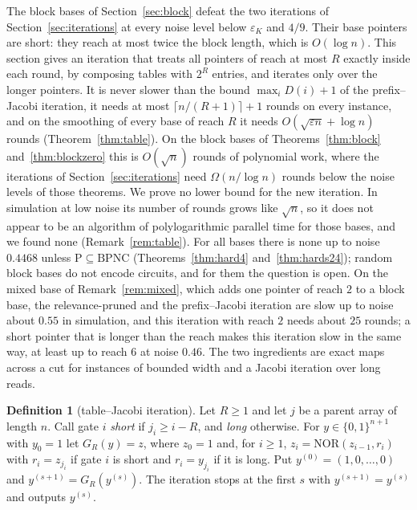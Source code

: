 \documentclass[11pt]{amsart}
\theoremstyle{definition}
\newtheorem{definition}[theorem]{Definition}
\theoremstyle{remark}
\newcommand{\eps}{\varepsilon}
\newcommand{\NOR}{\mathrm{NOR}}
\begin{document}
The block bases of Section~\ref{sec:block} defeat the two iterations of Section~\ref{sec:iterations} at every noise
level below $\eps_K$ and $4/9$. Their base pointers are short: they reach at most twice the block
length, which is $O(\log n)$. This section gives an iteration that treats all pointers of reach at
most $R$ exactly inside each round, by composing tables with $2^R$ entries, and iterates only
over the longer pointers. It is never slower than the bound $\max_iD(i)+1$ of the prefix--Jacobi
iteration, it needs at most $\lceil n/(R+1)\rceil+1$ rounds on every instance, and on the
smoothing of every base of reach $R$ it needs $O(\sqrt{\eps n}+\log n)$ rounds
(Theorem~\ref{thm:table}). On the block bases of Theorems~\ref{thm:block}
and~\ref{thm:blockzero} this is $O(\sqrt n)$ rounds of polynomial work, where the iterations of
Section~\ref{sec:iterations} need $\Omega(n/\log n)$ rounds below the noise levels of those theorems. We prove no lower
bound for the new iteration. In simulation at low noise its number of rounds grows like $\sqrt n$,
so it does not appear to be an algorithm of polylogarithmic parallel time for those bases, and we
found none (Remark~\ref{rem:table}). For all bases there is none up to noise $0.4468$ unless
$\mathrm P\subseteq\mathrm{BPNC}$ (Theorems~\ref{thm:hard4} and~\ref{thm:hards24}); random block bases do not encode
circuits, and for them the question is open. On the mixed base of Remark~\ref{rem:mixed}, which
adds one pointer of reach $2$ to a block base, the relevance-pruned and the prefix--Jacobi
iteration are slow up to noise about $0.55$ in simulation, and this iteration with reach $2$
needs about $25$ rounds; a short pointer that is longer than the reach makes this iteration slow
in the same way, at least up to reach $6$ at noise $0.46$. The two ingredients are exact maps across a cut for instances of bounded
width and a Jacobi iteration over long reads.

\begin{definition}[table--Jacobi iteration]\label{def:table}
Let $R\ge1$ and let $j$ be a parent array of length $n$. Call gate $i$ \emph{short} if
$j_i\ge i-R$, and \emph{long} otherwise. For $y\in\{0,1\}^{n+1}$ with $y_0=1$ let $G_R(y)=z$, where
$z_0=1$ and, for $i\ge1$, $z_i=\NOR(z_{i-1},r_i)$ with $r_i=z_{j_i}$ if gate $i$ is short and
$r_i=y_{j_i}$ if it is long. Put $y^{(0)}=(1,0,\dots,0)$ and $y^{(s+1)}=G_R(y^{(s)})$. The iteration
stops at the first $s$ with $y^{(s+1)}=y^{(s)}$ and outputs $y^{(s)}$.
\end{definition}
\end{document}

